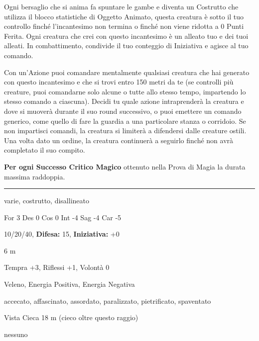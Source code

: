 \begin{multicols}{2}
Ogni bersaglio che si anima fa spuntare le gambe e diventa un Costrutto che utilizza il blocco statistiche di Oggetto Animato, questa creatura è sotto il tuo controllo finché l'incantesimo non termina o finché non viene ridotta a 0 Punti Ferita. Ogni creatura che crei con questo incantesimo è un alleato tuo e dei tuoi alleati. In combattimento, condivide il tuo conteggio di Iniziativa e agisce al tuo comando.

Con un'Azione puoi comandare mentalmente qualsiasi creatura che hai generato con questo incantesimo e che si trovi entro 150 metri da te (se controlli più creature, puoi comandarne solo alcune o tutte allo stesso tempo, impartendo lo stesso comando a ciascuna).
Decidi tu quale azione intraprenderà la creatura e dove si muoverà durante il suo round successivo, o puoi emettere un comando generico, come quello di fare la guardia a una particolare stanza o corridoio.
Se non impartisci comandi, la creatura si limiterà a difendersi dalle creature ostili. Una volta dato un ordine, la creatura continuerà a seguirlo finché non avrà completato il suo compito.

\textbf{Per ogni Successo Critico Magico} ottenuto nella Prova di Magia la durata massima raddoppia.

\medskip

\noindent\rule{\linewidth}{2pt}  \hypertarget{Oggetto Animato}{}\medskip {}
\noindent
\begin{description}[noitemsep, topsep=0pt, parsep=0pt, partopsep=0pt, leftmargin=0cm, labelwidth=2.2cm]
	\item[\textbf{Tipo:}] varie, costrutto, disallineato
	\item[\textbf{Caratt.:}] For 3 Des 0 Cos 0 Int -4 Sag -4 Car -5
	\item[\textbf{Punti Ferita:}] 10/20/40,  \textbf{Difesa:} 15,  \textbf{Iniziativa:} +0
	\item[\textbf{Movimento:}] 6 m
	\item[\textbf{Tiri Salvezza:}] Tempra +3, Riflessi +1, Volontà 0
	\item[\textbf{Imm. Danni:}] Veleno, Energia Positiva, Energia Negativa
	\item[\textbf{Immunità:}] accecato, affascinato, assordato, paralizzato, pietrificato, spaventato
	\item[\textbf{Sensi:}] Vista Cieca 18 m (cieco oltre questo raggio)
	\item[\textbf{Sfida:}] nessuno\smallskip
\end{description}


\end{multicols}
